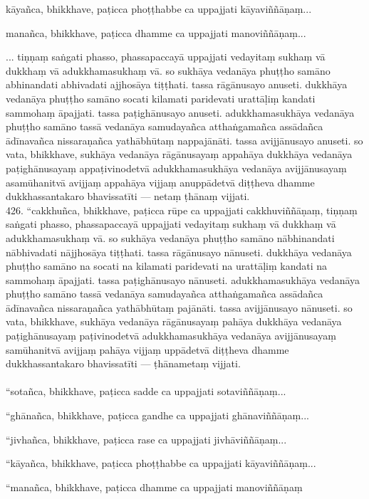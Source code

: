 \documentclass[10pt]{article}
\begin{document}
kāyañca, bhikkhave, paṭicca phoṭṭhabbe ca uppajjati kāyaviññāṇaṃ...\

manañca, bhikkhave, paṭicca dhamme ca uppajjati manoviññāṇaṃ...\

... tiṇṇaṃ saṅgati phasso, phassapaccayā uppajjati vedayitaṃ sukhaṃ vā dukkhaṃ vā adukkhamasukhaṃ vā. so sukhāya vedanāya phuṭṭho samāno abhinandati abhivadati ajjhosāya tiṭṭhati. tassa rāgānusayo anuseti. dukkhāya vedanāya phuṭṭho samāno socati kilamati paridevati urattāḷiṃ kandati sammohaṃ āpajjati. tassa paṭighānusayo anuseti. adukkhamasukhāya vedanāya phuṭṭho samāno tassā vedanāya samudayañca atthaṅgamañca assādañca ādīnavañca nissaraṇañca yathābhūtaṃ nappajānāti. tassa avijjānusayo anuseti. so vata, bhikkhave, sukhāya vedanāya rāgānusayaṃ appahāya dukkhāya vedanāya paṭighānusayaṃ appaṭivinodetvā adukkhamasukhāya vedanāya avijjānusayaṃ asamūhanitvā avijjaṃ appahāya vijjaṃ anuppādetvā diṭṭheva dhamme dukkhassantakaro bhavissatīti — netaṃ ṭhānaṃ vijjati.\\

426. “cakkhuñca, bhikkhave, paṭicca rūpe ca uppajjati cakkhuviññāṇaṃ, tiṇṇaṃ saṅgati phasso, phassapaccayā uppajjati vedayitaṃ sukhaṃ vā dukkhaṃ vā adukkhamasukhaṃ vā. so sukhāya vedanāya phuṭṭho samāno nābhinandati nābhivadati nājjhosāya tiṭṭhati. tassa rāgānusayo nānuseti. dukkhāya vedanāya phuṭṭho samāno na socati na kilamati paridevati na urattāḷiṃ kandati na sammohaṃ āpajjati. tassa paṭighānusayo nānuseti. adukkhamasukhāya vedanāya phuṭṭho samāno tassā vedanāya samudayañca atthaṅgamañca assādañca ādīnavañca nissaraṇañca yathābhūtaṃ pajānāti. tassa avijjānusayo nānuseti. so vata, bhikkhave, sukhāya vedanāya rāgānusayaṃ pahāya dukkhāya vedanāya paṭighānusayaṃ paṭivinodetvā adukkhamasukhāya vedanāya avijjānusayaṃ samūhanitvā avijjaṃ pahāya vijjaṃ uppādetvā diṭṭheva dhamme dukkhassantakaro bhavissatīti — ṭhānametaṃ vijjati.\\
\pagebreak\\


“sotañca, bhikkhave, paṭicca sadde ca uppajjati sotaviññāṇaṃ...\

“ghānañca, bhikkhave, paṭicca gandhe ca uppajjati ghānaviññāṇaṃ...\

“jivhañca, bhikkhave, paṭicca rase ca uppajjati jivhāviññāṇaṃ...\

“kāyañca, bhikkhave, paṭicca phoṭṭhabbe ca uppajjati kāyaviññāṇaṃ...\

“manañca, bhikkhave, paṭicca dhamme ca uppajjati manoviññāṇaṃ\
\end{document}

